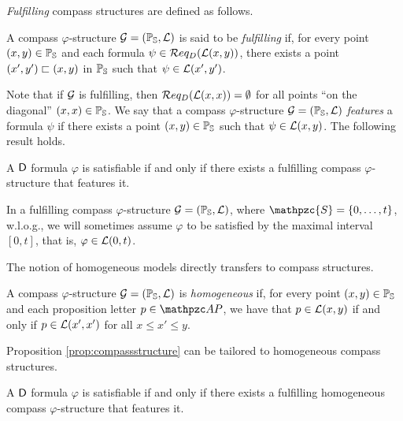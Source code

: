 \emph{Fulfilling} compass structures are defined as follows.
%
\begin{definition}\label{def:fulfillingcompass}
A compass $\varphi$-structure
$\mathcal{G}=(\mathbb{P}_{\mathbb{S}},\mathcal{L})$ is said to be \emph{fulfilling}
if, for every point $(x,y)\in\mathbb{P}_{\mathbb{S}}$ and each formula 
$\psi\in \mathcal{R} eq_D(\mathcal{L}(x,y))$, 
there exists a point $(x',y')\sqsubset (x,y)$ in $\mathbb{P}_{\mathbb{S}}$ such that 
$\psi \in \mathcal{L}(x',y')$.
\end{definition}
Note that if $\mathcal{G}$ is fulfilling, then $\mathcal{R} eq_D(\mathcal{L}(x,x))=\emptyset$ for all points ``on the diagonal'' $(x,x)\in\mathbb{P}_{\mathbb{S}}$.
%
%
We say that a compass $\varphi$-structure $\mathcal{G}=(\mathbb{P}_{\mathbb{S}},\mathcal{L})$
\emph{features} a formula $\psi$ if there exists a point $(x,y)\in\mathbb{P}_{\mathbb{S}}$
such that $\psi \in \mathcal{L}(x,y)$.
The following result holds.
%
\begin{proposition}\label{prop:compassstructure}
A $\mathsf{D}$ formula $\varphi$ is satisfiable if and only if there exists a fulfilling compass $\varphi$-structure that
features it.
\end{proposition}

In a fulfilling compass $\varphi$-structure  $\mathcal{G}=(\mathbb{P}_{\mathbb{S}},\mathcal{L})$, where $\mathpzc{S}=\{0,\ldots,t\}$, w.l.o.g., we will sometimes assume  $\varphi$ to be satisfied by the maximal interval $[0,t]$, that is, $\varphi\in\mathcal{L}(0,t)$.%

The notion of homogeneous models directly transfers to compass structures.
%
\begin{definition}\label{def:hom_compass}
A compass $\varphi$-structure $\mathcal{G}=(\mathbb{P}_{\mathbb{S}},\mathcal{L})$ is \emph{homogeneous}
if, for every point $(x,y)\in \mathbb{P}_{\mathbb{S}}$ and each proposition letter $p\in \AP$,
we have that $p\in \mathcal{L}(x,y)$ if and only if $p\in \mathcal{L}(x',x')$ for all $x\leq x'\leq y$.
\end{definition}

Proposition \ref{prop:compassstructure} can be tailored to homogeneous compass structures.
%
\begin{proposition}\label{prop:satiffcompass}
A $\mathsf{D}$ formula $\varphi$ is satisfiable if and only if there exists a fulfilling homogeneous compass $\varphi$-structure that
features it.
\end{proposition}